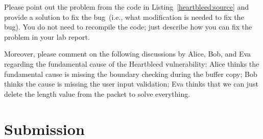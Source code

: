 Please point out the problem from the code in
Listing~\ref{heartbleed:source} and provide a solution to fix the
bug~(i.e., what modification is needed to fix the bug). You do not need to
recompile the code; just describe how you can fix the problem in your lab
report. 


Moreover, please comment on the following discussions by Alice, Bob, and
Eva regarding the fundamental cause of the Heartbleed vulnerability: 
Alice thinks the fundamental cause is missing the
boundary checking during the buffer copy; Bob thinks the cause is missing the
user input validation; Eva thinks that we can just delete the length value
from the packet to solve everything. 




\section{Submission}






